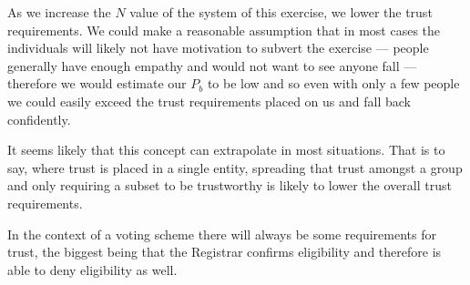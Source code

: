 As we increase the $N$ value of the system of this exercise, we lower the trust requirements. We could make a reasonable assumption that in most cases the individuals will likely not have motivation to subvert the exercise --- people generally have enough empathy and would not want to see anyone fall --- therefore we would estimate our $P_b$ to be low and so even with only a few people we could easily exceed the trust requirements placed on us and fall back confidently.

It seems likely that this concept can extrapolate in most situations. That is to say, where trust is placed in a single entity, spreading that trust amongst a group and only requiring a subset to be trustworthy is likely to lower the overall trust requirements.

In the context of a voting scheme there will always be some requirements for trust, the biggest being that the Registrar confirms eligibility and therefore is able to deny eligibility as well.

